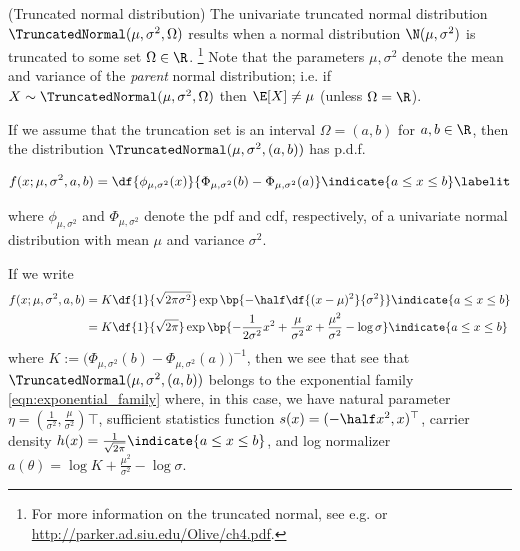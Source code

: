 \documentclass{article} %
\newcommand{\sufficientStatsFunction}{s}
\newcommand{\carrierDensity}{h}
\newcommand{\param}{\theta}
\newcommand{\naturalParam}{\eta}
\begin{document}
\begin{example}{(Truncated normal distribution)} 
\label{ex:truncated_normal_as_ef} The univariate truncated normal distribution $\TruncatedNormal(\mu,  \sigma^2,  \Omega)$ results when a normal distribution $\N(\mu,  \sigma^2)$ is truncated to some set $\Omega \in \R$. \footnote{For more information on the truncated normal,  see e.g.  \cite{burkardt2014truncated} or \url{http://parker.ad.siu.edu/Olive/ch4.pdf}.}   Note that the parameters $\mu, \sigma^2$ denote the mean and variance of the \textit{parent} normal distribution;  i.e.  if $X \sim \TruncatedNormal(\mu,  \sigma^2,  \Omega)$ then $\E[X] \neq \mu$ (unless $\Omega = \R$). 

If we assume that the truncation set is an interval $\Omega = (a,b)$ for $a,b \in \R$,  then the distribution $\TruncatedNormal(\mu,  \sigma^2,  (a,b))$ has p.d.f.

\begin{align*}
f(x ; \mu,  \sigma^2,  a,  b) = \df{\phi_{\mu, \sigma^2} (x) }{\Phi_{\mu, \sigma^2} (b)  - \Phi_{\mu, \sigma^2} (a) } \indicate{a \leq x \leq b} \labelit \label{eqn:pdf_of_normal_truncated_to_an_interval}
\end{align*} 

where $\phi_{\mu,  \sigma^2}$ and $\Phi_{\mu,  \sigma^2}$ denote the pdf and cdf,  respectively,  of a univariate normal distribution with mean $\mu$ and variance $\sigma^2$.   

If we write
\begin{align*}
f(x ; \mu,  \sigma^2,  a,  b) & = K \df{1}{\sqrt{2 \pi \sigma^2}} \exp \bp{-\half \df{(x-\mu)^2}{\sigma^2}}  \indicate{a \leq x \leq b} \\
& = K \df{1}{\sqrt{2 \pi}} \exp \bp{ - \frac{1}{2 \sigma^2} x^2 + \frac{\mu}{\sigma^2} x  + \frac{\mu^2}{\sigma^2}  - \log \sigma}  \indicate{a \leq x \leq b} 
\end{align*} 
where $K := \big( \Phi_{\mu, \sigma^2} (b)  - \Phi_{\mu, \sigma^2} (a) \big)^{-1}$,  then we see that see that  $\TruncatedNormal(\mu,  \sigma^2,  (a,b))$ belongs to the exponential family \eqref{eqn:exponential_family} where,  in this case,  we have natural parameter $\naturalParam = (\frac{1}{\sigma^2},  \frac{\mu}{\sigma^2})\top$,  sufficient statistics function $\sufficientStatsFunction(x) = (-\half x^2,  x)^\top$,  carrier density $\carrierDensity(x) =  \frac{1}{\sqrt{2 \pi}}  \indicate{a \leq x \leq b}$,  and log normalizer $a(\param) = \log K + \frac{\mu^2}{\sigma^2} - \log \sigma$.
 
\end{example}
\end{document}
